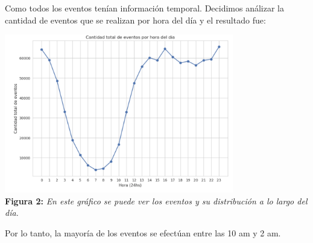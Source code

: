 \documentclass[titlepage,a4paper]{article}
\begin{document}
	Como todos los eventos tenían información temporal. Decidimos análizar la cantidad de eventos que se realizan por hora del día y el resultado fue:
	\begin{center}
	\includegraphics[width=10cm]{cantidadDeEventosPorHoraDelDia.jpg}\\
	\textbf{Figura 2:}  \textit{En este gráfico se puede ver los eventos y su distribución a lo largo del día. }
	\end{center}
	Por lo tanto, la mayoría de los eventos se efectúan entre las 10 am y 2 am. 
	
\end{document}
